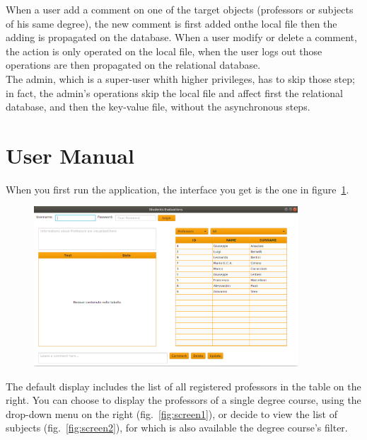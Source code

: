\documentclass[a4paper, oneside]{article}
\begin{document}
When a user add a comment on one of the target objects (professors or subjects of his same degree), the new comment is first added onthe local file then the adding is propagated on the database. When a user modify or delete a comment, the action is only operated on the local file, when the user logs out those operations are then propagated on the relational database.\\
The admin, which is a super-user whith higher privileges, has to skip those step; in fact, the admin’s operations skip the local file and affect first the relational database, and then the key-value file, without the asynchronous steps.\\



\clearpage
\section{User Manual}
When you first run the application, the interface you get is the one in figure~\ref{fig:screen0}. 

\begin{figure}[h]
\centering
\includegraphics[width=0.88\textwidth]{images/screens/screen0}
\label{fig:screen0}
\end{figure}

The default display includes the list of all registered professors in the table on the right. You can choose to display the professors of a single degree course, using the drop-down menu on the right (fig.~\ref{fig:screen1}), or decide to view the list of subjects (fig.~\ref{fig:screen2}), for which is also available the degree course's filter. 
\end{document}
